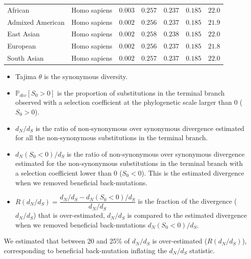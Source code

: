 \documentclass{article}
\newcommand{\dn}{d_N}
\newcommand{\ds}{d_S}
\newcommand{\dnds}{\dn / \ds}
\newcommand{\Sphy}{S_{0}}
\begin{document}
\begin{center}
\begin{longtable*}{|l|l|r|r|r|r|r|}
            African &        Homo sapiens &               $ 0.003$ &                $ 0.257$ &        $ 0.237$ &              $ 0.185$ &           $  22.0$ \\
            Admixed American &        Homo sapiens &               $ 0.002$ &                $ 0.256$ &        $ 0.237$ &              $ 0.185$ &           $  21.9$ \\
            East Asian &        Homo sapiens &               $ 0.002$ &                $ 0.258$ &        $ 0.238$ &              $ 0.185$ &           $  22.0$ \\
            European &        Homo sapiens &               $ 0.002$ &                $ 0.256$ &        $ 0.237$ &              $ 0.185$ &           $  21.8$ \\
            South Asian &        Homo sapiens &               $ 0.002$ &                $ 0.257$ &        $ 0.237$ &              $ 0.185$ &           $  22.0$ \\
        \end{longtable*}
    \end{center}
    \begin{itemize}
        \item Tajima $\theta$ is the synonymous diversity.
        \item $\mathbb{P}_{div}[\Sphy > 0]$ is the proportion of substitutions in the terminal branch observed with a selection coefficient at the phylogenetic scale larger than 0 ($\Sphy > 0$).
        \item $\dnds$ is the ratio of non-synonymous over synonymous divergence estimated for all the non-synonymous substitutions in the terminal branch.
        \item $\dn(\Sphy < 0) / \ds$ is the ratio of non-synonymous over synonymous divergence estimated for the non-synonymous substitutions in the terminal branch with a selection coefficient lower than 0 ($\Sphy < 0$).
        This is the estimated divergence when we removed beneficial back-mutations.
        \item $R(\dnds)=\dfrac{\dnds - \dn(\Sphy < 0) / \ds}{\dnds}$ is the fraction of the divergence ($\dnds$) that is over-estimated, $\dnds$ is compared to the estimated divergence when we removed beneficial back-mutations $\dn(\Sphy < 0) / \ds$.
    \end{itemize}
    We estimated that between 20 and 25\% of $\dnds$ is over-estimated ($R(\dnds)$), corresponding to beneficial back-mutation inflating the $\dnds$ statistic.
\end{document}
